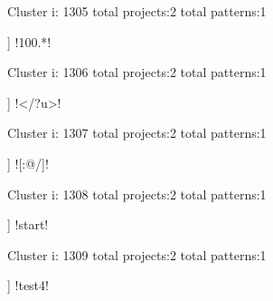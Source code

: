 Cluster i: 1305
total projects:2
total patterns:1
\begin{multicols}{1}
\begin{description}[noitemsep,topsep=0pt]
\item [[2] ] \cverb!100.*!
\end{description}
\end{multicols}







Cluster i: 1306
total projects:2
total patterns:1
\begin{multicols}{1}
\begin{description}[noitemsep,topsep=0pt]
\item [[2] ] \cverb!</?u>!
\end{description}
\end{multicols}







Cluster i: 1307
total projects:2
total patterns:1
\begin{multicols}{1}
\begin{description}[noitemsep,topsep=0pt]
\item [[2] ] \cverb![:@/]!
\end{description}
\end{multicols}







Cluster i: 1308
total projects:2
total patterns:1
\begin{multicols}{1}
\begin{description}[noitemsep,topsep=0pt]
\item [[2] ] \cverb!start!
\end{description}
\end{multicols}







Cluster i: 1309
total projects:2
total patterns:1
\begin{multicols}{1}
\begin{description}[noitemsep,topsep=0pt]
\item [[2] ] \cverb!test4!
\end{description}
\end{multicols}







